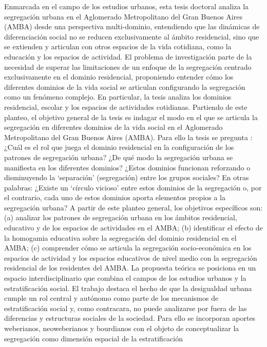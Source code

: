 \documentclass[
  spanish,
  a4paper,%
  chapterprefix=true,%
  DIV=calc,%
  twoside]{scrbook}%
\begin{document}
Enmarcada en el campo de los estudios urbanos, esta tesis doctoral analiza
la segregación urbana en el Aglomerado Metropolitano del Gran Buenos Aires
(AMBA) desde una perspectiva multi-dominio, entendiendo que las dinámicas de
diferenciación social no se reducen exclusivamente al ámbito residencial,
sino que se extienden y articulan con otros espacios de la vida cotidiana,
como la educación y los espacios de actividad. El problema de investigación
parte de la necesidad de superar las limitaciones de un enfoque de la
segregación centrado exclusivamente en el dominio residencial, proponiendo
entender cómo los diferentes dominios de la vida social se articulan configurando
la segregación como un fenómeno complejo. En particular, la tesis analiza los
dominios residencial, escolar y los espacios de actividades cotidianas.
Partiendo de este planteo, el objetivo general de la tesis es
indagar el modo en el que se articula la segregación en diferentes dominios
de la vida social en el Aglomerado Metropolitano del Gran Buenos Aires (AMBA).
Para ello la tesis se pregunta : ¿Cuál es el rol que juega el dominio
residencial en la configuración de los patrones de segregación urbana?
¿De qué modo la segregación urbana se manifiesta en los diferentes dominios?
¿Estos dominios funcionan reforzando o disminuyendo la `separación'
(segregación) entre los grupos sociales? En otras palabras: ¿Existe un `círculo
vicioso' entre estos dominios de la segregación o, por el contrario, cada uno de
estos dominios aporta elementos propios a la segregación urbana? A partir de este
planteo general, los objetivos específicos son: (a) analizar los patrones de
segregación urbana en los ámbitos residencial, educativo y de los espacios de
actividades en el AMBA; (b) identificar el efecto de la homogamia educativa sobre
la segregación del dominio residencial en el AMBA; (c) comprender cómo se
articula la segregación socio-económica en los espacios de actividad y los
espacios educativos de nivel medio con la segregación residencial de los
residentes del AMBA. La propuesta teórica se posiciona en un espacio
interdisciplinario que combina el campos de
los estudios urbanos y la estratificación social. El trabajo destaca el hecho de
que la desigualdad urbana cumple un rol central y autónomo como parte de los
mecanismos de estratificación social y, como contracara, no puede analizarse por
fuera de las diferencias y estructuras sociales de la sociedad. Para ello se
incorporan aportes weberianos, neoweberianos y bourdianos con el objeto de
conceptualizar la segregación como dimensión espacial de la estratificación
\end{document}
